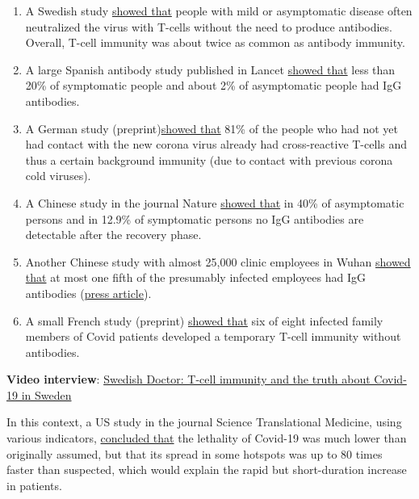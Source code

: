\begin{enumerate}
\def\labelenumi{\arabic{enumi}.}
\tightlist
\item
  A Swedish study
  \href{https://news.ki.se/immunity-to-covid-19-is-probably-higher-than-tests-have-shown}{showed
  that} people with mild or asymptomatic disease often neutralized the
  virus with T-cells without the need to produce antibodies. Overall,
  T-cell immunity was about twice as common as antibody immunity.
\item
  A large Spanish antibody study published in Lancet
  \href{https://www.thelancet.com/journals/lancet/article/PIIS0140-6736(20)31483-5/fulltext}{showed
  that} less than 20\% of symptomatic people and about 2\% of
  asymptomatic people had IgG antibodies.
\item
  A German study
  (preprint)\href{https://www.researchsquare.com/article/rs-35331/v1}{showed
  that} 81\% of the people who had not yet had contact with the new
  corona virus already had cross-reactive T-cells and thus a certain
  background immunity (due to contact with previous corona cold
  viruses).
\item
  A Chinese study in the journal Nature
  \href{https://www.nature.com/articles/s41591-020-0965-6}{showed that}
  in 40\% of asymptomatic persons and in 12.9\% of symptomatic persons
  no IgG antibodies are detectable after the recovery phase.
\item
  Another Chinese study with almost 25,000 clinic employees in Wuhan
  \href{https://www.medrxiv.org/content/10.1101/2020.06.13.20130252v1}{showed
  that} at most one fifth of the presumably infected employees had IgG
  antibodies
  (\href{https://www.scmp.com/news/china/science/article/3089476/there-may-be-no-immunity-against-covid-19-new-wuhan-study}{press
  article}).
\item
  A small French study (preprint)
  \href{https://www.medrxiv.org/content/10.1101/2020.06.21.20132449v1}{showed
  that} six of eight infected family members of Covid patients developed
  a temporary T-cell immunity without antibodies.
\end{enumerate}

\textbf{Video interview}:
\href{https://www.youtube.com/watch?v=CwQpg62Kflg}{Swedish Doctor:
T-cell immunity and the truth about Covid-19 in Sweden}

In this context, a US study in the journal Science Translational
Medicine, using various indicators,
\href{https://news.psu.edu/story/623797/2020/06/22/research/initial-covid-19-infection-rate-may-be-80-times-greater-originally}{concluded
that} the lethality of Covid-19 was much lower than originally assumed,
but that its spread in some hotspots was up to 80 times faster than
suspected, which would explain the rapid but short-duration increase in
patients.

